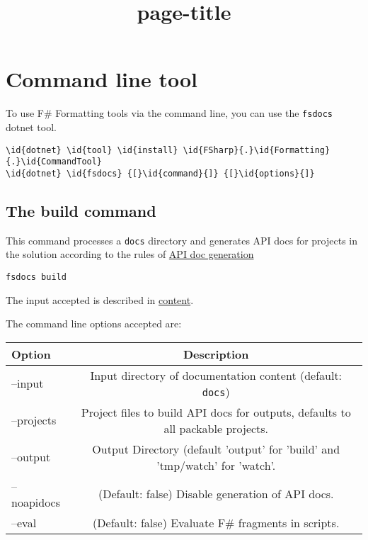 \documentclass{article}
\title{{page-title}}
\date{}
\newcommand{\id}[1]{\textcolor{black}{#1}}
\begin{document}
\maketitle

\section*{Command line tool}



To use F\# Formatting tools via the command line, you can use the \texttt{fsdocs} dotnet tool.
\begin{Verbatim}[commandchars=\\\{\}]
\id{dotnet} \id{tool} \id{install} \id{FSharp}{.}\id{Formatting}{.}\id{CommandTool}
\id{dotnet} \id{fsdocs} {[}\id{command}{]} {[}\id{options}{]}

\end{Verbatim}

\subsection*{The build command}



This command processes a \texttt{docs} directory and generates API docs for projects in the solution according to the
rules of \href{apidocs.html}{API doc generation}
\begin{lstlisting}
fsdocs build

\end{lstlisting}


The input accepted is described in \href{content.html}{content}.


The command line options accepted are:
\begin{tabular}{|l|c|}\hline
\textbf{Option} & \textbf{Description}\\ \hline\hline
--input & Input directory of documentation content (default: \texttt{docs})\\ \hline
--projects & Project files to build API docs for outputs, defaults to all packable projects.\\ \hline
--output & Output Directory (default 'output' for 'build' and 'tmp/watch' for 'watch'.\\ \hline
--noapidocs & (Default: false) Disable generation of API docs.\\ \hline
--eval & (Default: false) Evaluate F\# fragments in scripts.\\ \hline
\end{tabular}
\end{document}

